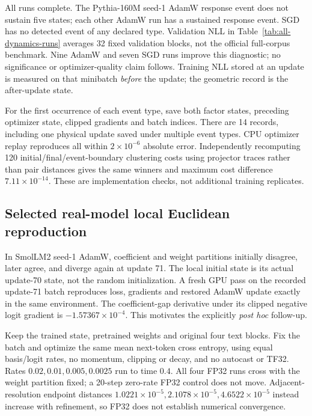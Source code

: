 

All runs complete. The Pythia-160M seed-1 AdamW response event does not
sustain five states; each other AdamW run has a sustained response event.
SGD has no detected event of any declared type. Validation NLL in
Table~\ref{tab:all-dynamics-runs} averages 32 fixed validation blocks,
not the official full-corpus benchmark. Nine AdamW and seven SGD runs
improve this diagnostic; no significance or optimizer-quality claim follows.
Training NLL stored at an update is measured on that minibatch
\emph{before} the update; the geometric record is the after-update state.

For the first occurrence of each event type, save both factor states,
preceding optimizer state, clipped gradients and batch indices. There are
14 records, including one physical update saved under multiple event types.
CPU optimizer replay reproduces all within $2\times10^{-6}$ absolute error.
Independently recomputing 120 initial/final/event-boundary clustering costs
using projector traces rather than pair distances gives the same winners
and maximum cost difference $7.11\times10^{-14}$. These are implementation
checks, not additional training replicates.

\subsection{Selected real-model local Euclidean reproduction}

In SmolLM2 seed-1 AdamW, coefficient and weight partitions initially
disagree, later agree, and diverge again at update 71. The local initial state is its
actual update-70 state, not the random initialization. A fresh GPU pass
on the recorded update-71 batch reproduces loss, gradients and restored
AdamW update exactly in the same environment. The coefficient-gap derivative
under its clipped negative logit gradient is $-1.57367\times10^{-4}$.
This motivates the explicitly \emph{post hoc} follow-up.

Keep the trained state, pretrained weights and original four text blocks.
Fix the batch and optimize the same mean next-token cross entropy, using
equal basis/logit rates, no momentum, clipping or decay, and no autocast or
TF32. Rates $0.02,0.01,0.005,0.0025$ run to time $0.4$. All four FP32
runs cross with the weight partition fixed; a 20-step zero-rate FP32 control
does not move. Adjacent-resolution endpoint distances
$1.0221\times10^{-5},2.1078\times10^{-5},4.6522\times10^{-5}$ instead
increase with refinement, so FP32 does not establish numerical convergence.

